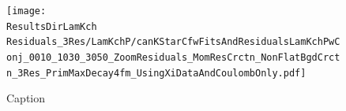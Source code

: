 \documentclass[../AnalysisNoteJBuxton.tex]{subfiles}
\begin{document}

\begin{figure}[h]
  \centering
  \texttt{[image: \\ResultsDirLamKch Residuals\_3Res/LamKchP/canKStarCfwFitsAndResidualsLamKchPwConj\_0010\_1030\_3050\_ZoomResiduals\_MomResCrctn\_NonFlatBgdCrctn\_3Res\_PrimMaxDecay4fm\_UsingXiDataAndCoulombOnly.pdf]}
  \caption[Small Caption]{Caption}
  \label{fig:LamKchPwConjFitsAndResiduals_3Res}
\end{figure}
\end{document}
